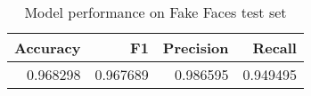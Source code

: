 \begin{table}
\centering
\caption{Model performance on Fake Faces test set}
\label{vgg10-fakeface-metrics}
\begin{tabular}{rrrr}
\toprule
 Accuracy &        F1 &  Precision &    Recall \\
\midrule
 0.968298 &  0.967689 &   0.986595 &  0.949495 \\
\bottomrule
\end{tabular}
\end{table}

